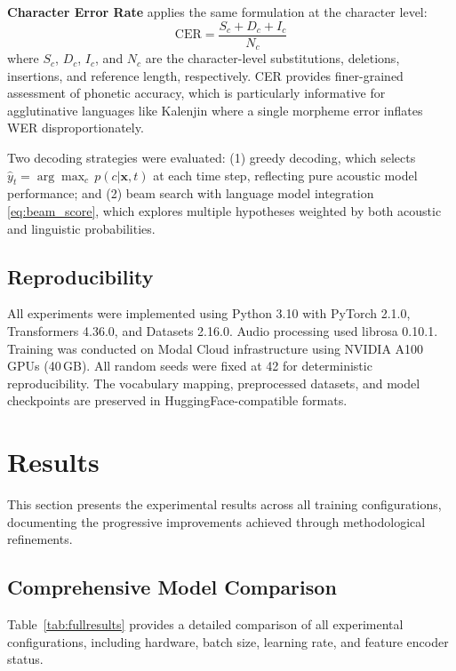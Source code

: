 \documentclass[conference]{IEEEtran}
\begin{document}
\textbf{Character Error Rate} applies the same formulation at the character level:
\begin{equation}
\text{CER} = \frac{S_c + D_c + I_c}{N_c}
\label{eq:cer}
\end{equation}
where $S_c$, $D_c$, $I_c$, and $N_c$ are the character-level substitutions, deletions, insertions, and reference length, respectively. CER provides finer-grained assessment of phonetic accuracy, which is particularly informative for agglutinative languages like Kalenjin where a single morpheme error inflates WER disproportionately.

Two decoding strategies were evaluated: (1) greedy decoding, which selects $\hat{y}_t = \arg\max_c\, p(c | \mathbf{x}, t)$ at each time step, reflecting pure acoustic model performance; and (2) beam search with language model integration \eqref{eq:beam_score}, which explores multiple hypotheses weighted by both acoustic and linguistic probabilities.

\subsection{Reproducibility}

All experiments were implemented using Python 3.10 with PyTorch 2.1.0, Transformers 4.36.0, and Datasets 2.16.0. Audio processing used librosa 0.10.1. Training was conducted on Modal Cloud infrastructure using NVIDIA A100 GPUs (40\,GB). All random seeds were fixed at 42 for deterministic reproducibility. The vocabulary mapping, preprocessed datasets, and model checkpoints are preserved in HuggingFace-compatible formats.

\section{Results}

This section presents the experimental results across all training configurations, documenting the progressive improvements achieved through methodological refinements.

\subsection{Comprehensive Model Comparison}

Table~\ref{tab:fullresults} provides a detailed comparison of all experimental configurations, including hardware, batch size, learning rate, and feature encoder status.
\end{document}
